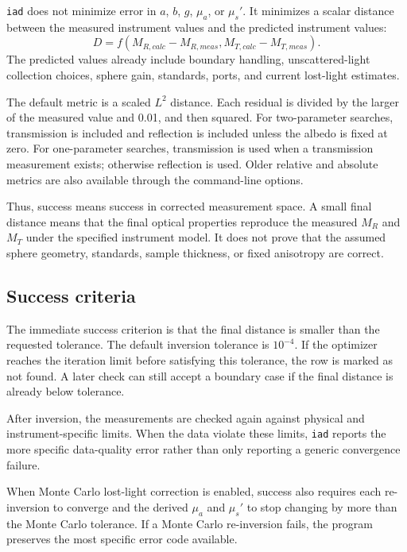 \documentclass{article}
\newcommand\iadprog{\texttt{iad}}
\begin{document}
\iadprog{} does not minimize error in $a$, $b$, $g$, $\mu_a$, or $\mu_s'$.
It minimizes a scalar distance between the measured instrument values and the
predicted instrument values:
\[
  D = f(M_{R,\mathit{calc}}-M_{R,\mathit{meas}},
        M_{T,\mathit{calc}}-M_{T,\mathit{meas}}).
\]
The predicted values already include boundary handling, unscattered-light
collection choices, sphere gain, standards, ports, and current lost-light
estimates.

The default metric is a scaled $L^2$ distance.  Each residual is divided by
the larger of the measured value and 0.01, and then squared.  For
two-parameter searches, transmission is included and reflection is included
unless the albedo is fixed at zero.  For one-parameter searches, transmission
is used when a transmission measurement exists; otherwise reflection is used.
Older relative and absolute metrics are also available through the command-line
options.

Thus, success means success in corrected measurement space.  A small final
distance means that the final optical properties reproduce the measured
$M_R$ and $M_T$ under the specified instrument model.  It does not prove that
the assumed sphere geometry, standards, sample thickness, or fixed anisotropy
are correct.

\subsection{Success criteria}

The immediate success criterion is that the final distance is smaller than the
requested tolerance.  The default inversion tolerance is $10^{-4}$.  If the
optimizer reaches the iteration limit before satisfying this tolerance, the row
is marked as not found.  A later check can still accept a boundary case if the
final distance is already below tolerance.

After inversion, the measurements are checked again against physical and
instrument-specific limits.  When the data violate these limits, \iadprog{}
reports the more specific data-quality error rather than only reporting a
generic convergence failure.

When Monte Carlo lost-light correction is enabled, success also requires each
re-inversion to converge and the derived $\mu_a$ and $\mu_s'$ to stop changing
by more than the Monte Carlo tolerance.  If a Monte Carlo re-inversion fails,
the program preserves the most specific error code available.
\end{document}
